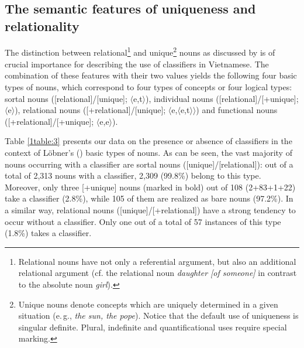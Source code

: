 \documentclass[output=paper]{langsci/langscibook}
\begin{document}
\subsection{The semantic features of uniqueness and relationality}\label{1sec:32}

{
The distinction between relational\footnote{Relational
    nouns have not only a referential argument, but also an additional relational argument (cf. the relational noun {\emph{daughter [of someone]}} in contrast to the absolute noun {\emph{girl}}).
    }
 and unique\footnote{Unique
    nouns denote concepts which are uniquely determined in a given situation (e.\,g., {\emph{the sun, the pope}}). Notice that the default use of uniqueness is singular definite. Plural, indefinite and quantificational uses require special marking.}
nouns as discussed by \cite{lobner:85,lobner:11} is of crucial importance for describing the use of classifiers in Vietnamese. The combination of these features with their two values yields the following four basic types of nouns, which correspond to four types of concepts or four logical types: sortal nouns ([\minus relational]/[\minus unique]; $\langle$e,t$\rangle$), individual nouns ([\minus relational]/[+unique]; $\langle$e$\rangle$), relational nouns ([+relational]/[\minus unique]; $\langle$e,$\langle$e,t$\rangle\rangle$) and functional nouns ([+relational]/[+unique]; $\langle$e,e$\rangle$).
}

{
Table \ref{1table:3} presents our data on the presence or absence of classifiers in the context of L\"obner's (\citeyear{lobner:85,lobner:11}) basic types of nouns. As can be seen, the vast majority of nouns occurring with a classifier are sortal nouns ([\minus unique]/[\minus relational]): out} of a total of 2,313 nouns with a classifier, 2,309 (99.8\%) belong to this type. Moreover, only three [+unique] nouns (marked in bold) out of 108 (2+83+1+22) take a classifier (2.8\%), while 105 of them are realized as bare nouns (97.2\%). In a similar way, relational nouns ([\minus unique]/[+relational]) have a strong tendency to occur without a classifier. Only one out of a total of 57 instances of this type (1.8\%) takes a classifier.
\end{document}
